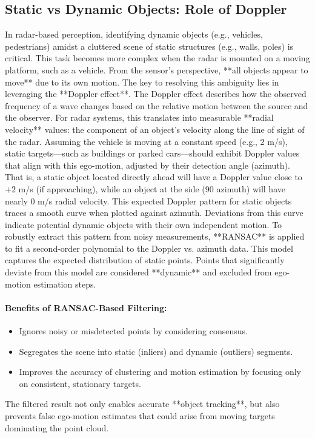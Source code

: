 \subsection{Static vs Dynamic Objects: Role of Doppler}

In radar-based perception, identifying dynamic objects (e.g., vehicles, pedestrians) amidst a cluttered scene of static structures (e.g., walls, poles) is critical.
This task becomes more complex when the radar is mounted on a moving platform, such as a vehicle.
From the sensor's perspective, **all objects appear to move** due to its own motion. The key to resolving this ambiguity lies in leveraging the **Doppler effect**.
The Doppler effect describes how the observed frequency of a wave changes based on the relative motion between the source and the observer. For radar systems, this translates into measurable **radial velocity** values: the component of an object's velocity along the line of sight of the radar.
Assuming the vehicle is moving at a constant speed (e.g., 2 m/s), static targets—such as buildings or parked cars—should exhibit Doppler values that align with this ego-motion, adjusted by their detection angle (azimuth).
That is, a static object located directly ahead will have a Doppler value close to $+2$ m/s (if approaching), while an object at the side (90 azimuth) will have nearly 0 m/s radial velocity.
This expected Doppler pattern for static objects traces a smooth curve when plotted against azimuth. Deviations from this curve indicate potential dynamic objects with their own independent motion.
To robustly extract this pattern from noisy measurements, **RANSAC** is applied to fit a second-order polynomial to the Doppler vs. azimuth data. This model captures the expected distribution of static points.
Points that significantly deviate from this model are considered **dynamic** and excluded from ego-motion estimation steps.

\paragraph{Benefits of RANSAC-Based Filtering:}
\begin{itemize}
    \item Ignores noisy or misdetected points by considering consensus.
    \item Segregates the scene into static (inliers) and dynamic (outliers) segments.
    \item Improves the accuracy of clustering and motion estimation by focusing only on consistent, stationary targets.
\end{itemize}

The filtered result not only enables accurate **object tracking**, but also prevents false ego-motion estimates that could arise from moving targets dominating the point cloud.